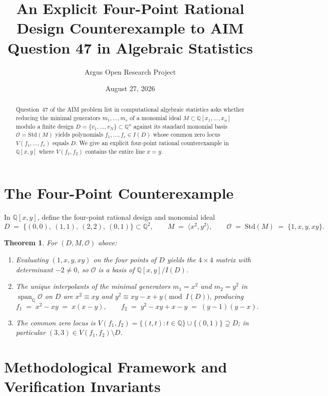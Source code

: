 \documentclass[10pt,reqno]{amsart}
\title[An Explicit Four-Point Rational Counterexample to AIM Question 47]
{An Explicit Four-Point Rational Design Counterexample to AIM Question 47 in Algebraic Statistics}
\author{Argus Open Research Project}
\date{August 27, 2026}
\newtheorem{theorem}{Theorem}[section]
\theoremstyle{definition}
\begin{document}
\begin{abstract}
Question~47 of the AIM problem list in computational algebraic statistics asks whether reducing the minimal generators $m_1,\dots,m_r$ of a monomial ideal $M\subset\mathbb{Q}[x_1,\dots,x_n]$ modulo a finite design $D=\{v_1,\dots,v_N\}\subset\mathbb{Q}^n$ against its standard monomial basis $\mathcal{O}=\mathrm{Std}(M)$ yields polynomials $f_1,\dots,f_r\in I(D)$ whose common zero locus $V(f_1,\dots,f_r)$ equals $D$. We give an explicit four-point rational counterexample in $\mathbb{Q}[x,y]$ where $V(f_1,f_2)$ contains the entire line $x=y$.
\end{abstract}
\maketitle
\section{The Four-Point Counterexample}
In $\mathbb{Q}[x,y]$, define the four-point rational design and monomial ideal
\[
  D \;=\; \bigl\{(0,0),\ (1,1),\ (2,2),\ (0,1)\bigr\} \subset \mathbb{Q}^2,
  \qquad
  M \;=\; \langle x^2, y^2\rangle,
  \qquad
  \mathcal{O} \;=\; \mathrm{Std}(M) \;=\; \{1, x, y, xy\}.
\]
\begin{theorem}
For $(D, M, \mathcal{O})$ above:
\begin{enumerate}[label=\textup{(\arabic*)}]
  \item Evaluating $(1,x,y,xy)$ on the four points of $D$ yields the $4\times 4$ matrix with determinant $-2\neq 0$, so $\mathcal{O}$ is a basis of $\mathbb{Q}[x,y]/I(D)$.
  \item The unique interpolants of the minimal generators $m_1=x^2$ and $m_2=y^2$ in $\operatorname{span}_{\mathbb{Q}}\mathcal{O}$ on $D$ are $x^2\equiv xy$ and $y^2\equiv xy-x+y\pmod{I(D)}$, producing
  \[
    f_1 \;=\; x^2 - xy \;=\; x(x-y),
    \qquad
    f_2 \;=\; y^2 - xy + x - y \;=\; (y-1)(y-x).
  \]
  \item The common zero locus is $V(f_1,f_2) = \{(t,t) : t\in\mathbb{Q}\}\cup\{(0,1)\}\supsetneq D$; in particular $(3,3)\in V(f_1,f_2)\setminus D$.
\end{enumerate}
\end{theorem}

\section{Methodological Framework and Verification Invariants}
\end{document}
